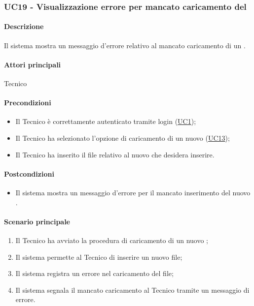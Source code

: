 \subsubsection{UC19 - Visualizzazione errore per mancato caricamento del }\label{UC19}
\paragraph*{Descrizione}
Il sistema mostra un messaggio d’errore relativo al mancato caricamento di un .

\paragraph*{Attori principali}
Tecnico

\paragraph*{Precondizioni}
\begin{itemize}
  \item Il Tecnico è correttamente autenticato tramite login (\hyperref[UC1]{UC1});
  \item Il Tecnico ha selezionato l’opzione di caricamento di un nuovo  (\hyperref[UC13]{UC13});
  \item Il Tecnico ha inserito il file relativo al nuovo  che desidera inserire.  
\end{itemize}

\paragraph*{Postcondizioni}
\begin{itemize}
  \item Il sistema mostra un messaggio d’errore per il mancato inserimento del nuovo .
\end{itemize}

\paragraph*{Scenario principale}
\begin{enumerate}
  \item Il Tecnico ha avviato la procedura di caricamento di un nuovo ;
  \item Il sistema permette al Tecnico di inserire un nuovo file;
  \item Il sistema registra un errore nel caricamento del file;
  \item Il sistema segnala il mancato caricamento al Tecnico tramite un messaggio di errore.  
\end{enumerate}